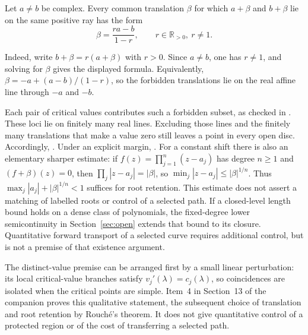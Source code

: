 \documentclass[11pt]{article}
\begin{document}
\begin{theorem}\label{res:locus}
Let $a\ne b$ be complex.  Every common translation $\beta$ for which $a+\beta$
and $b+\beta$ lie on the same positive ray has the form
\[
  \beta=\frac{ra-b}{1-r},
  \qquad r\in\mathbb{R}_{>0},\ r\ne1 .
\]
\end{theorem}

Indeed, write $b+\beta=r(a+\beta)$ with $r>0$. Since $a\ne b$,
one has $r\ne1$, and solving for $\beta$ gives the displayed formula.
Equivalently, $\beta=-a+(a-b)/(1-r)$, so the forbidden translations
lie on the real affine line through $-a$ and $-b$.

\noindent Each pair of critical values contributes such a forbidden subset, as checked in
.
These loci lie on finitely many real lines. Excluding those lines and
the finitely many translations that make a value zero still leaves a
point in every open disc. Accordingly,
.
Under an explicit margin,
.
For a constant shift there is also an elementary sharper estimate: if
$f(z)=\prod_{j=1}^n(z-a_j)$ has degree $n\ge1$ and $(f+\beta)(z)=0$, then
$\prod_j|z-a_j|=|\beta|$, so
$\min_j|z-a_j|\le|\beta|^{1/n}$. Thus
$\max_j|a_j|+|\beta|^{1/n}<1$ suffices for root retention. This estimate
does not assert a matching of labelled roots or control of a selected path.
If a closed-level length bound holds on a dense class of polynomials,
the fixed-degree lower semicontinuity in Section~\ref{sec:open} extends
that bound to its closure.  Quantitative forward transport of a selected curve
requires additional control, but is not a premise of that existence argument.

The distinct-value premise can be arranged first by a small linear
perturbation: its local critical-value branches satisfy
$v_j'(\lambda)=c_j(\lambda)$, so coincidences are isolated when the
critical points are simple. Item~4 in Section~13 of the companion proves this
qualitative statement, the subsequent choice of translation and root
retention by Rouch\'e's theorem. It does not give quantitative control
of a protected region or of the cost of transferring a selected path.
\end{document}
